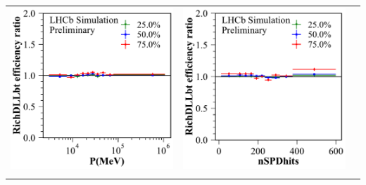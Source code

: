 \documentclass{article}
\begin{document}
\begin{tabular}{l@{\hskip -0.0in}c@{\hskip -0.0in}c}
\includegraphics[width=0.32\linewidth]{eff_ratio_RichDLLbt_vs_Brunel_P_at_[0.05, 0.1, 0.25, 0.5, 0.75, 0.9, 0.95].pdf} &
\includegraphics[width=0.32\linewidth]{eff_ratio_RichDLLbt_vs_nSPDhits_at_[0.05, 0.1, 0.25, 0.5, 0.75, 0.9, 0.95].pdf} \\
\vspace{-0.2cm}
\end{tabular}
\end{document}
